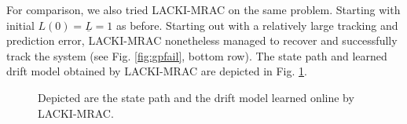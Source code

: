 For comparison, we also tried LACKI-MRAC on the same problem. Starting with initial $L(0) =\underline L =1$ as before. Starting out with a relatively large tracking and prediction error, LACKI-MRAC nonetheless managed to recover and successfully track the system (see  Fig. \ref{fig:gpfail}, bottom row). The state path and learned drift model obtained by LACKI-MRAC are depicted in Fig. \ref{fig:gpfail2}.

\begin{figure}
        \centering
				   	\hspace{.5cm}
   \caption{Depicted are the state path and the drift model learned online by LACKI-MRAC.}
	\label{fig:gpfail2}
\end{figure}	 